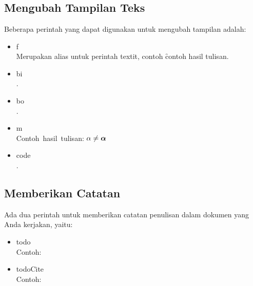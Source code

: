 \chapter{\babLima}
\thispagestyle{fancy}


\section{Mengubah Tampilan Teks}
Beberapa perintah yang dapat digunakan untuk mengubah tampilan adalah: 
\begin{itemize}
	\item \bslash f \\
		Merupakan alias untuk perintah \bslash textit, contoh 
		\f{contoh hasil tulisan}.
	\item \bslash bi \\
		.
	\item \bslash bo \\
		.
	\item \bslash m \\
		Contoh\ hasil\ tulisan: $\alpha \not= \bm{\alpha}$
	\item \bslash code \\ 
		.
\end{itemize}


\section{Memberikan Catatan}
Ada dua perintah untuk memberikan catatan penulisan dalam dokumen yang Anda 
kerjakan, yaitu: 
\begin{itemize}
	\item \bslash todo \\
		Contoh: \\ 
	\item \bslash todoCite \\ 
		Contoh: \todoCite
\end{itemize}


